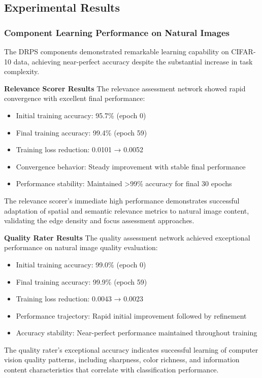 \documentclass[12pt]{article}
\begin{document}
\subsection{Experimental Results}\label{results}

\subsubsection{Component Learning Performance on Natural Images}\label{component-performance}

The DRPS components demonstrated remarkable learning capability on CIFAR-10 data, achieving near-perfect accuracy despite the substantial increase in task complexity.

\textbf{Relevance Scorer Results}
The relevance assessment network showed rapid convergence with excellent final performance:
\begin{itemize}
\item Initial training accuracy: 95.7\% (epoch 0)
\item Final training accuracy: 99.4\% (epoch 59)
\item Training loss reduction: 0.0101 → 0.0052
\item Convergence behavior: Steady improvement with stable final performance
\item Performance stability: Maintained >99\% accuracy for final 30 epochs
\end{itemize}

The relevance scorer's immediate high performance demonstrates successful adaptation of spatial and semantic relevance metrics to natural image content, validating the edge density and focus assessment approaches.

\textbf{Quality Rater Results}
The quality assessment network achieved exceptional performance on natural image quality evaluation:
\begin{itemize}
\item Initial training accuracy: 99.0\% (epoch 0)
\item Final training accuracy: 99.9\% (epoch 59)
\item Training loss reduction: 0.0043 → 0.0023
\item Performance trajectory: Rapid initial improvement followed by refinement
\item Accuracy stability: Near-perfect performance maintained throughout training
\end{itemize}

The quality rater's exceptional accuracy indicates successful learning of computer vision quality patterns, including sharpness, color richness, and information content characteristics that correlate with classification performance.
\end{document}

